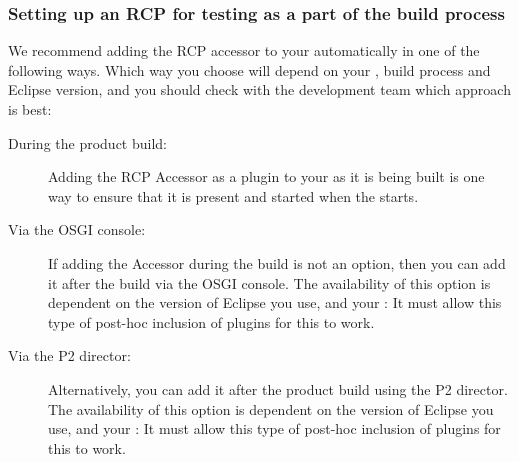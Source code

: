\subsubsection{Setting up an RCP \gdaut{} for testing as a part of the build process}
\label{ToolkitRCPSetupCI}
We recommend adding the RCP accessor to your \gdaut{} automatically in one of the following ways. Which way you choose will depend on your \gdaut{}, build process and Eclipse version, and you should check with the development team which approach is best:

\begin{description}
\item [During the product build:]{Adding the RCP Accessor as a plugin to your \gdaut{} as it is being built is one way to ensure that it is present and started when the \gdaut{} starts.}
\item [Via the OSGI console:]{If adding the Accessor during the build is not an option, then you can add it after the build via the OSGI console. The availability of this option is dependent on the version of Eclipse you use, and your \gdaut{}: It must allow this type of post-hoc inclusion of plugins for this to work.}
\item [Via the P2 director:]{Alternatively, you can add it after the product build using the P2 director. The availability of this option is dependent on the version of Eclipse you use, and your \gdaut{}: It  must allow this type of post-hoc inclusion of plugins for this to work.}
\end{description}
